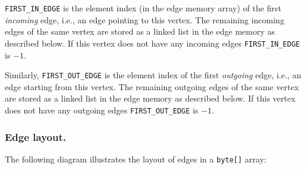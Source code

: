 \texttt{FIRST\_IN\_EDGE} is the element index (in the edge memory array) of the first \emph{incoming} edge, i.e., an edge pointing to this vertex. The remaining incoming edges of the same vertex are stored as a linked list in the edge memory as described below.
If this vertex does not have any incoming edges \texttt{FIRST\_IN\_EDGE} is $-1$.

Similarly, \texttt{FIRST\_OUT\_EDGE} is the element index of the first \emph{outgoing} edge, i.e., an edge starting from this vertex. The remaining outgoing edges of the same vertex are stored as a linked list in the edge memory as described below.
If this vertex does not have any outgoing edges \texttt{FIRST\_OUT\_EDGE} is $-1$.

\subsubsection{Edge layout.}
The following diagram illustrates the layout of edges in a \texttt{byte[]} array:
